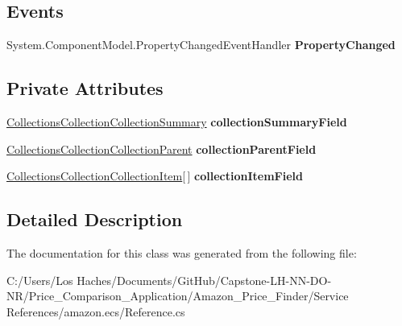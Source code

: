 \subsection*{Events}
\begin{DoxyCompactItemize}
\item 
\hypertarget{class_price___comparison_1_1amazon_1_1ecs_1_1_collections_collection_acc78e2b1f902bb3a93783913897853fd}{System.\-Component\-Model.\-Property\-Changed\-Event\-Handler {\bfseries Property\-Changed}}\label{class_price___comparison_1_1amazon_1_1ecs_1_1_collections_collection_acc78e2b1f902bb3a93783913897853fd}

\end{DoxyCompactItemize}
\subsection*{Private Attributes}
\begin{DoxyCompactItemize}
\item 
\hypertarget{class_price___comparison_1_1amazon_1_1ecs_1_1_collections_collection_adb4540b96a4f53de3fa180f9fc4c3072}{\hyperlink{class_price___comparison_1_1amazon_1_1ecs_1_1_collections_collection_collection_summary}{Collections\-Collection\-Collection\-Summary} {\bfseries collection\-Summary\-Field}}\label{class_price___comparison_1_1amazon_1_1ecs_1_1_collections_collection_adb4540b96a4f53de3fa180f9fc4c3072}

\item 
\hypertarget{class_price___comparison_1_1amazon_1_1ecs_1_1_collections_collection_a9c841acefdcf4a448ef945aae57fd358}{\hyperlink{class_price___comparison_1_1amazon_1_1ecs_1_1_collections_collection_collection_parent}{Collections\-Collection\-Collection\-Parent} {\bfseries collection\-Parent\-Field}}\label{class_price___comparison_1_1amazon_1_1ecs_1_1_collections_collection_a9c841acefdcf4a448ef945aae57fd358}

\item 
\hypertarget{class_price___comparison_1_1amazon_1_1ecs_1_1_collections_collection_a92e263bcb4e568c843db399565b02b5c}{\hyperlink{class_price___comparison_1_1amazon_1_1ecs_1_1_collections_collection_collection_item}{Collections\-Collection\-Collection\-Item}\mbox{[}$\,$\mbox{]} {\bfseries collection\-Item\-Field}}\label{class_price___comparison_1_1amazon_1_1ecs_1_1_collections_collection_a92e263bcb4e568c843db399565b02b5c}

\end{DoxyCompactItemize}


\subsection{Detailed Description}


The documentation for this class was generated from the following file\-:\begin{DoxyCompactItemize}
\item 
C\-:/\-Users/\-Los Haches/\-Documents/\-Git\-Hub/\-Capstone-\/\-L\-H-\/\-N\-N-\/\-D\-O-\/\-N\-R/\-Price\-\_\-\-Comparison\-\_\-\-Application/\-Amazon\-\_\-\-Price\-\_\-\-Finder/\-Service References/amazon.\-ecs/Reference.\-cs\end{DoxyCompactItemize}

